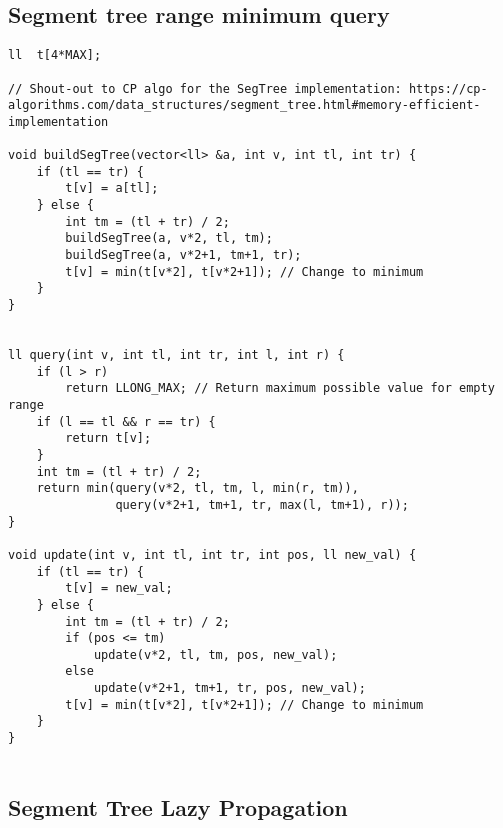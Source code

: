 \documentclass{article}
\begin{document}
\subsection{Segment tree range minimum query}
\begin{lstlisting}
ll  t[4*MAX];
 
// Shout-out to CP algo for the SegTree implementation: https://cp-algorithms.com/data_structures/segment_tree.html#memory-efficient-implementation
 
void buildSegTree(vector<ll> &a, int v, int tl, int tr) {
    if (tl == tr) {
        t[v] = a[tl];
    } else {
        int tm = (tl + tr) / 2;
        buildSegTree(a, v*2, tl, tm);
        buildSegTree(a, v*2+1, tm+1, tr);
        t[v] = min(t[v*2], t[v*2+1]); // Change to minimum
    }
}
 
 
ll query(int v, int tl, int tr, int l, int r) {
    if (l > r) 
        return LLONG_MAX; // Return maximum possible value for empty range
    if (l == tl && r == tr) {
        return t[v];
    }
    int tm = (tl + tr) / 2;
    return min(query(v*2, tl, tm, l, min(r, tm)),
               query(v*2+1, tm+1, tr, max(l, tm+1), r));
}
 
void update(int v, int tl, int tr, int pos, ll new_val) {
    if (tl == tr) {
        t[v] = new_val;
    } else {
        int tm = (tl + tr) / 2;
        if (pos <= tm)
            update(v*2, tl, tm, pos, new_val);
        else
            update(v*2+1, tm+1, tr, pos, new_val);
        t[v] = min(t[v*2], t[v*2+1]); // Change to minimum
    }
}
 
\end{lstlisting}
\subsection{Segment Tree Lazy Propagation}
\end{document}
